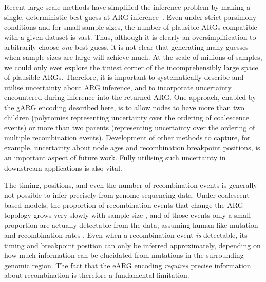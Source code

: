 \documentclass{article}
\begin{document}
Recent large-scale methods have simplified the inference problem by
making a single, deterministic best-guess at ARG
inference~\citep{kelleher2019inferring,speidel2019method,zhan2023towards}.
Even under strict parsimony conditions and for small sample sizes, the
number of plausible ARGs compatible with a given dataset is vast.
Thus, although it is clearly an oversimplification to arbitrarily
choose \emph{one} best guess,
it is not clear that generating many guesses
when sample sizes are large will achieve much.
At the scale of millions of samples,
we could only ever explore the tiniest corner of the incomprehensibly
large space of plausible ARGs.
Therefore, it is important to systematically
describe and utilise uncertainty about ARG inference, and to
incorporate uncertainty encountered during inference into the returned ARG.
One approach, enabled by the gARG encoding described here, is to allow
nodes to have more than two children (polytomies
representing uncertainty over the ordering of coalescence events) or
more than two parents (representing uncertainty over the ordering
of multiple recombination events). Development of other methods to capture, for example,
uncertainty about node ages and recombination breakpoint positions, is an important
aspect of future work.
Fully utilising such uncertainty in downstream
applications is also vital.

The timing, positions, and even the number of recombination events is generally
not possible to infer precisely from genome sequencing data. Under
coalescent-based models, the proportion of recombination events that change the
ARG topology grows very slowly with sample size \citep{hein2004gene}, and of those
events only a small proportion are actually detectable from the data, assuming
human-like mutation and recombination
rates \citep{myers2002detection,hayman2023recoverability}.
Even when a recombination event \emph{is} detectable, its timing and breakpoint
position can only be inferred approximately, depending on how much information
can be elucidated from mutations in the surrounding genomic region.
The fact that the eARG encoding \emph{requires}
precise information about recombination is therefore a fundamental limitation.
\end{document}
